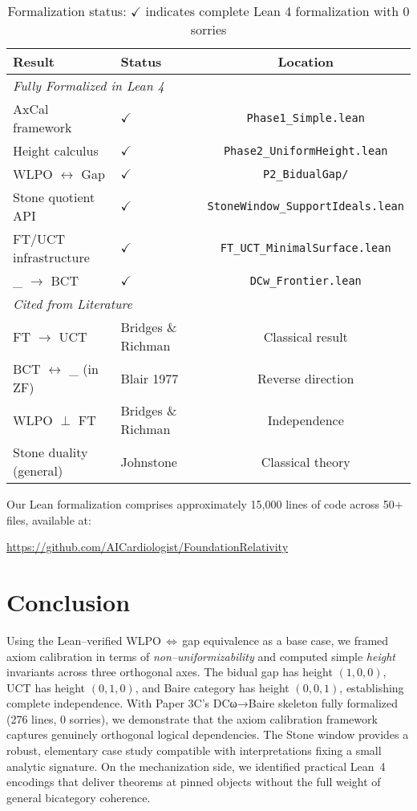 \documentclass[11pt]{article}
\theoremstyle{definition}
\theoremstyle{remark}
\newcommand{\DCw}{\mathrm{DC}_\omega}
\begin{document}
\begin{table}[h]
\centering
\begin{tabular}{llc}
\hline
\textbf{Result} & \textbf{Status} & \textbf{Location} \\
\hline
\multicolumn{3}{l}{\textit{Fully Formalized in Lean 4}} \\
AxCal framework & $\checkmark$ & \texttt{Phase1\_Simple.lean} \\
Height calculus & $\checkmark$ & \texttt{Phase2\_UniformHeight.lean} \\
WLPO $\leftrightarrow$ Gap & $\checkmark$ & \texttt{P2\_BidualGap/} \\
Stone quotient API & $\checkmark$ & \texttt{StoneWindow\_SupportIdeals.lean} \\
FT/UCT infrastructure & $\checkmark$ & \texttt{FT\_UCT\_MinimalSurface.lean} \\
\DCw{} $\rightarrow$ BCT & $\checkmark$ & \texttt{DCw\_Frontier.lean} \\
\hline
\multicolumn{3}{l}{\textit{Cited from Literature}} \\
FT $\rightarrow$ UCT & Bridges \& Richman & Classical result \\
BCT $\leftrightarrow$ \DCw{} (in ZF) & Blair 1977 & Reverse direction \\
WLPO $\perp$ FT & Bridges \& Richman & Independence \\
Stone duality (general) & Johnstone & Classical theory \\
\hline
\end{tabular}
\caption{Formalization status: $\checkmark$ indicates complete Lean 4 formalization with 0 sorries}
\label{tab:verification}
\end{table}

Our Lean formalization comprises approximately 15,000 lines of code across 50+ files, available at:
\begin{center}
\url{https://github.com/AICardiologist/FoundationRelativity}
\end{center}

\section{Conclusion}

Using the Lean–verified WLPO\,$\Leftrightarrow$\,gap equivalence as a base case, we framed axiom calibration in terms of \emph{non--uniformizability} and computed simple \emph{height} invariants across three orthogonal axes. The bidual gap has height $(1,0,0)$, UCT has height $(0,1,0)$, and Baire category has height $(0,0,1)$, establishing complete independence. With Paper 3C's DCω→Baire skeleton fully formalized (276 lines, 0 sorries), we demonstrate that the axiom calibration framework captures genuinely orthogonal logical dependencies. The Stone window provides a robust, elementary case study compatible with interpretations fixing a small analytic signature. On the mechanization side, we identified practical Lean~4 encodings that deliver theorems at pinned objects without the full weight of general bicategory coherence. 
\end{document}
